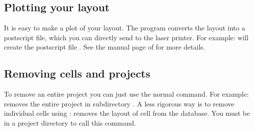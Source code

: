 \subsection{Plotting your layout}
It is easy to make a plot of your layout. The program  converts
the layout into a postscript file, which you can directly send to the
laser printer. For example: 
will create the postscript file . See the manual page of
 for more details.

\subsection{Removing cells and projects}
To remove an entire project you can just use the normal  command.
For example: \cd{} removes the entire project in
subdirectory
. A less rigorous way is to remove individual cells using
: 
removes the layout of
cell  from the database. You must be in a project directory to
call this command. 

